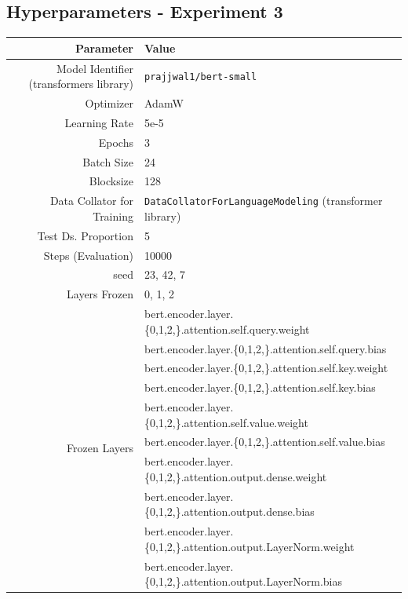 \documentclass{article}
\begin{document}
\subsection{Hyperparameters - Experiment 3}
\begin{table}[!h]
    \centering
    \begin{tabular}{r|l}
        Parameter & Value \\ \hline
        Model Identifier (transformers library) & \texttt{prajjwal1/bert-small} \\
        Optimizer & AdamW \\
        Learning Rate & 5e-5 \\
        Epochs & 3 \\
        Batch Size & 24 \\
        Blocksize & 128 \\
        Data Collator for Training & \texttt{DataCollatorForLanguageModeling} (transformer library) \\
        Test Ds. Proportion & 5 \\
        Steps (Evaluation) & 10000 \\
        seed & 23, 42, 7\\
        Layers Frozen & 0, 1, 2 \\
         \multirow{16}{*}{Frozen Layers} &     bert.encoder.layer.\{0,1,2,\}.attention.self.query.weight \\
                      &      bert.encoder.layer.\{0,1,2,\}.attention.self.query.bias \\
                      &      bert.encoder.layer.\{0,1,2,\}.attention.self.key.weight \\
                      &      bert.encoder.layer.\{0,1,2,\}.attention.self.key.bias \\
                      &      bert.encoder.layer.\{0,1,2,\}.attention.self.value.weight \\
                      &      bert.encoder.layer.\{0,1,2,\}.attention.self.value.bias \\
                      &      bert.encoder.layer.\{0,1,2,\}.attention.output.dense.weight \\
                      &      bert.encoder.layer.\{0,1,2,\}.attention.output.dense.bias \\
                      &      bert.encoder.layer.\{0,1,2,\}.attention.output.LayerNorm.weight \\
                      &      bert.encoder.layer.\{0,1,2,\}.attention.output.LayerNorm.bias \\

\end{tabular}
\end{table}
\end{document}
